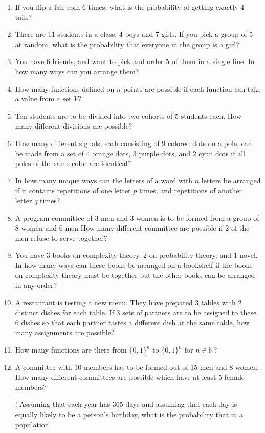 \documentclass{article}
\begin{document}
\begin{enumerate}
	\item If you flip a fair coin 6 times, what is the probability of getting exactly 4 tails?
	\item There are 11 students in a class: 4 boys and 7 girls. If you pick a group of 5 at random, what is the probability that everyone in the group is a girl?
	\item You have 6 friends, and want to pick and order 5 of them in a single line. In how many ways can you arrange them?
	\item How many functions defined on $n$ points are possible if each function can take a value from a set $V$?
	\item Ten students are to be divided into two cohorts of 5 students each. How many different divisions are possible? 
	\item How many different signals, each consisting of 9 colored dots on a pole, can be made from a set of 4 orange dots, 3 purple dots, and 2 cyan dots if all poles of the same color are identical?
	\item In how many unique ways can the letters of a word with $n$ letters be arranged if it contains repetitions of one letter $p$ times, and repetitions of another letter $q$ times?
	\item A program committee of 3 men and 3 women is to be formed from a group of 8 women and 6 men How many different committee are possible if 2 of the men refuse to serve together?
	\item You have 3 books on complexity theory, 2 on probability theory, and 1 novel. In how many ways can these books be arranged on a bookshelf if the books on complexity theory must be together but the other books can be arranged in any order?
	\item A restaurant is testing a new menu. They have prepared 3 tables with 2 distinct dishes for each table. If 3 sets of partners are to be assigned to these 6 dishes so that each partner tastes a different dish at the same table, how many assignments are possible?
	\item How many functions are there from $ \{0,1\}^{n} $ to $ \{0,1\}^{n} $ for $ n \in \mathbb{N} $?
	\item A committee with 10 members has to be formed out of 15 men and 8 women. How many different committees are possible which have at least 5 female members?
	\item[\arabic{enumi}!] Assuming that each year has 365 days and assuming that each day is equally likely to be a person's birthday, what is the probability that in a population

\end{enumerate}
\end{document}

